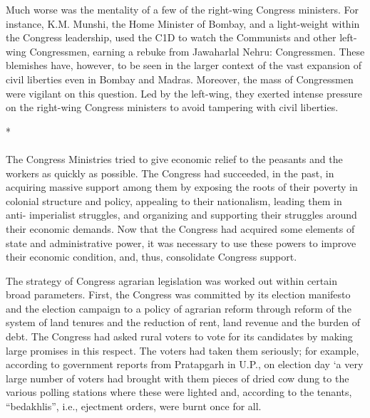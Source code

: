 Much worse was the mentality of a few of the right-wing Congress ministers. For instance, K.M. Munshi, the Home Minister of Bombay, and a light-weight within the Congress leadership, used the C1D to watch the Communists and other left-wing Congressmen, earning a rebuke from Jawaharlal Nehru: Congressmen. These blemishes have, however, to be seen in the larger context of the vast expansion of civil liberties even in Bombay and Madras. Moreover, the mass of Congressmen were vigilant on this question. Led by the left-wing, they exerted intense pressure on the right-wing Congress ministers to avoid tampering with civil liberties.

\begin{center}*\end{center}

\paragraph*{}

The Congress Ministries tried to give economic relief to the peasants and the workers as quickly as possible. The Congress had succeeded, in the past, in acquiring massive support among them by exposing the roots of their poverty in colonial structure and policy, appealing to their nationalism, leading them in anti- imperialist struggles, and organizing and supporting their struggles around their economic demands. Now that the Congress had acquired some elements of state and administrative power, it was necessary to use these powers to improve their economic condition, and, thus, consolidate Congress support. 

The strategy of Congress agrarian legislation was worked out within certain broad parameters. First, the Congress was committed by its election manifesto and the election campaign to a policy of agrarian reform through reform of the system of land tenures and the reduction of rent, land revenue and the burden of debt. The Congress had asked rural voters to vote for its candidates by making large promises in this respect. The voters had taken them seriously; for example, according to government reports from Pratapgarh in U.P., on election day `a very large number of voters had brought with them pieces of dried cow dung to the various polling stations where these were lighted and, according to the tenants, ``bedakhlis'', i.e., ejectment orders, were burnt once for all. 

